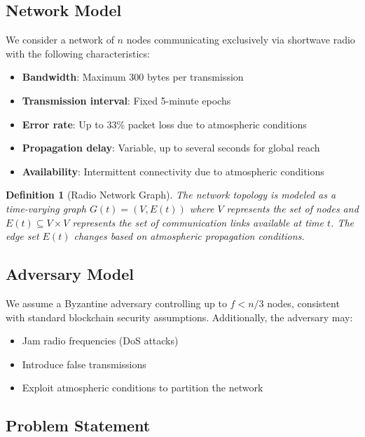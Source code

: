 \documentclass[11pt,a4paper]{article}
\newtheorem{definition}[theorem]{Definition}
\begin{document}
\subsection{Network Model}

We consider a network of $n$ nodes communicating exclusively via shortwave radio with the following characteristics:

\begin{itemize}
\item \textbf{Bandwidth}: Maximum 300 bytes per transmission
\item \textbf{Transmission interval}: Fixed 5-minute epochs
\item \textbf{Error rate}: Up to 33\% packet loss due to atmospheric conditions
\item \textbf{Propagation delay}: Variable, up to several seconds for global reach
\item \textbf{Availability}: Intermittent connectivity due to atmospheric conditions
\end{itemize}

\begin{definition}[Radio Network Graph]
The network topology is modeled as a time-varying graph $G(t) = (V, E(t))$ where $V$ represents the set of nodes and $E(t) \subseteq V \times V$ represents the set of communication links available at time $t$. The edge set $E(t)$ changes based on atmospheric propagation conditions.
\end{definition}

\subsection{Adversary Model}

We assume a Byzantine adversary controlling up to $f < n/3$ nodes, consistent with standard blockchain security assumptions. Additionally, the adversary may:

\begin{itemize}
\item Jam radio frequencies (DoS attacks)
\item Introduce false transmissions
\item Exploit atmospheric conditions to partition the network
\end{itemize}

\subsection{Problem Statement}
\end{document}
